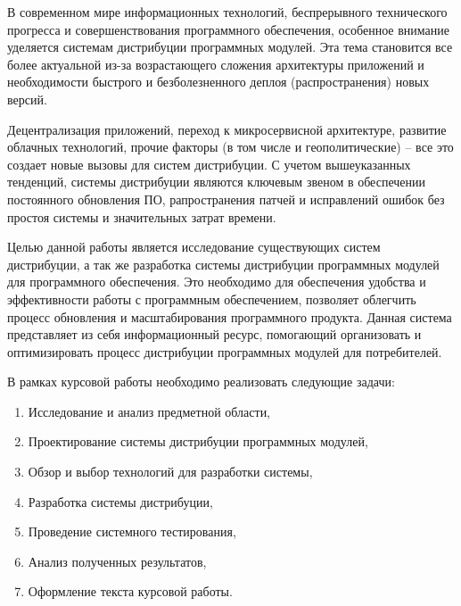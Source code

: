 \Introduction

В современном мире информационных технологий, беспрерывного технического прогресса и совершенствования программного обеспечения, особенное внимание уделяется системам дистрибуции программных модулей. Эта тема становится все более актуальной из-за возрастающего сложения архитектуры приложений и необходимости быстрого и безболезненного деплоя (распространения) новых версий.

Децентрализация приложений, переход к микросервисной архитектуре, развитие облачных технологий, прочие факторы (в том числе и геополитические) – все это создает новые вызовы для систем дистрибуции. С учетом вышеуказанных тенденций, системы дистрибуции являются ключевым звеном в обеспечении постоянного обновления ПО, рапространения патчей и исправлений ошибок без простоя системы и значительных затрат времени. 

Целью данной работы является исследование существующих систем дистрибуции, а так же разработка системы дистрибуции программных модулей для программного обеспечения. Это необходимо для обеспечения удобства и эффективности работы с программным обеспечением, позволяет облегчить процесс обновления и масштабирования программного продукта. Данная система представляет из себя информационный ресурс, помогающий организовать и оптимизировать процесс дистрибуции программных модулей для потребителей.

В рамках курсовой работы необходимо реализовать следующие задачи:

\renewcommand{\labelenumi}{\arabic{enumi})}
\renewcommand{\labelenumii}{\asbuk{enumii})}

\begin{enumerate}
\item Исследование и анализ предметной области,
\item Проектирование системы дистрибуции программных модулей,
\item Обзор и выбор технологий для разработки системы,
\item Разработка системы дистрибуции,
\item Проведение системного тестирования,
\item Анализ полученных результатов,
\item Оформление текста курсовой работы.
\end{enumerate}
